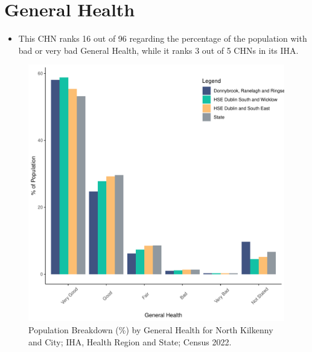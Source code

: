 \documentclass{article}
\begin{document}
\pagebreak

\section{General Health}\label{sect:GenHealth}
\begin{itemize}
\item  This CHN ranks  16 out of 96 regarding the percentage of the population with bad or very bad General Health, while it ranks   3 out of 5 CHNs in its IHA.
\end{itemize}
\begin{figure}[h]
	\centering
	\includegraphics[width = 150mm]{../figures/GenED.pdf}
	\caption{Population Breakdown (\%) by General Health for North Kilkenny and City; IHA, Health Region and State;  Census 2022.}
	\label{fig:2ae19629-1a6a-13a3-e055-000000000001}
	\end{figure}
\end{document}
